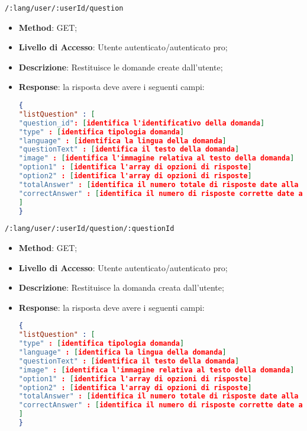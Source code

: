 \item \texttt{/:lang/user/:userId/question}
	\begin{itemize}
		\item \textbf{Method}: GET;
		\item \textbf{Livello di Accesso}: Utente autenticato/autenticato pro;
		\item \textbf{Descrizione}: Restituisce le domande create dall'utente;
		\item \textbf{Response}: la risposta deve avere i seguenti campi:
\begin{lstlisting}[language=json,firstnumber=1]
{
"listQuestion" : [ 
"question_id": [identifica l'identificativo della domanda]
"type" : [identifica tipologia domanda]
"language" : [identifica la lingua della domanda]
"questionText" : [identifica il testo della domanda]
"image" : [identifica l'immagine relativa al testo della domanda]
"option1" : [identifica l'array di opzioni di risposte]
"option2" : [identifica l'array di opzioni di risposte]
"totalAnswer" : [identifica il numero totale di risposte date alla domanda]
"correctAnswer" : [identifica il numero di risposte corrette date alla domanda]
]
}
\end{lstlisting}
	\end{itemize}	

\item \texttt{/:lang/user/:userId/question/:questionId}
	\begin{itemize}
		\item \textbf{Method}: GET;
		\item \textbf{Livello di Accesso}: Utente autenticato/autenticato pro;
		\item \textbf{Descrizione}: Restituisce la domanda creata dall'utente;
		\item \textbf{Response}: la risposta deve avere i seguenti campi:
\begin{lstlisting}[language=json,firstnumber=1]
{
"listQuestion" : [ 
"type" : [identifica tipologia domanda]
"language" : [identifica la lingua della domanda]
"questionText" : [identifica il testo della domanda]
"image" : [identifica l'immagine relativa al testo della domanda]
"option1" : [identifica l'array di opzioni di risposte]
"option2" : [identifica l'array di opzioni di risposte]
"totalAnswer" : [identifica il numero totale di risposte date alla domanda]
"correctAnswer" : [identifica il numero di risposte corrette date alla domanda]
]
}
\end{lstlisting}
	\end{itemize}	
	
